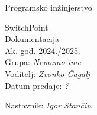 \documentclass[12pt]{report}
\begin{document}
	\begin{titlepage}
		\begin{center}
				\Large Programsko inžinjerstvo\\
				
				
				
				\Huge SwitchPoint\\
				\Large Dokumentacija\\
				\large Ak. god. 2024./2025.\\
				
				\normalsize
				Grupa: \textit{Nemamo ime}\\
				Voditelj: \textit{Zvonko Čagalj}\\
				
				
				Datum predaje: \textit{?}\\
				
				
				Nastavnik: \textit{Igor Stančin}\\
				
				
							
		\end{center}
	\end{titlepage}
	
	\tableofcontents
	
	
	
	
	
	\begingroup
	

	\listoffigures

	\endgroup

	
	
	
	\eject 
	
	
	
\end{document}
